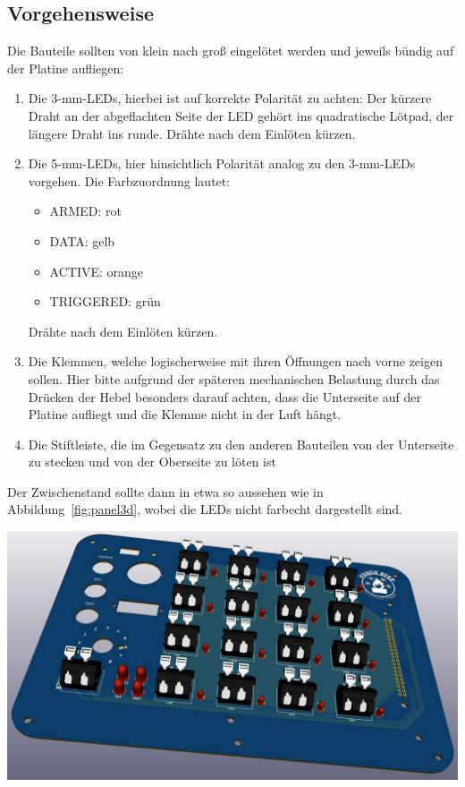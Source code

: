\documentclass[paper=a4, open=any, numbers=noenddot]{scrbook}
\begin{document}
			\subsection*{Vorgehensweise}

				Die Bauteile sollten von klein nach groß eingelötet werden und jeweils bündig auf der Platine aufliegen:
				\begin{enumerate}
					\item
					      Die 3-mm-LEDs, hierbei ist auf korrekte Polarität zu achten: Der kürzere Draht an der abgeflachten Seite der LED gehört ins quadratische Lötpad, der längere Draht ins runde. Drähte nach dem Einlöten kürzen.
					\item
					      Die 5-mm-LEDs, hier hinsichtlich Polarität analog zu den 3-mm-LEDs vorgehen. Die Farbzuordnung lautet:
					      \begin{itemize}
						      \item
						            ARMED: rot
						      \item
						            DATA: gelb
						      \item
						            ACTIVE: orange
						      \item
						            TRIGGERED: grün
					      \end{itemize}
					      Drähte nach dem Einlöten kürzen.
					\item
					      Die Klemmen, welche logischerweise mit ihren Öffnungen nach vorne zeigen sollen. Hier bitte aufgrund der späteren mechanischen Belastung durch das Drücken der Hebel besonders darauf achten, dass die Unterseite auf der Platine aufliegt und die Klemme nicht in der Luft hängt.
					\item
					      Die Stiftleiste, die im Gegensatz zu den anderen Bauteilen von der Unterseite zu stecken und von der Oberseite zu löten ist
				\end{enumerate}

				Der Zwischenstand sollte dann in etwa so aussehen wie in Abbildung~\ref{fig:panel3d}, wobei die LEDs nicht farbecht dargestellt sind.

				\begin{center}
					\includegraphics[width=.8\textwidth]{Bilder/panel3d}
					\label{fig:panel3d}
				\end{center}
\end{document}
